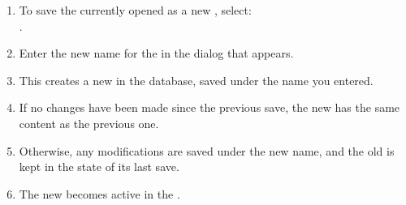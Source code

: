 
\begin{enumerate}
\item To save the currently opened \gdproject{} as a new \gdproject{}, select:\\
. 
\item Enter the new name for the \gdproject{} in the dialog that appears. 
\item This creates a new \gdproject{} in the database, saved under the name you entered. 
\item If no changes have been made since the previous \gdproject{} save, the
new \gdproject{} has the same content as  the previous one.
\item Otherwise, any modifications are saved under the new \gdproject{} name,
and the old \gdproject{} is kept in the state of its last save.
\item The new \gdproject{} becomes active in the  \ite{}.
\end{enumerate}






